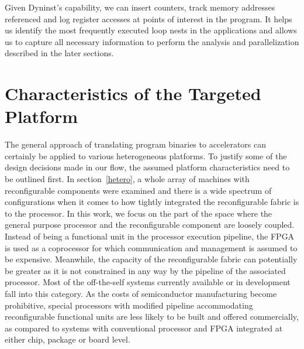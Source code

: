 Given Dyninst's capability, we can insert counters, track memory addresses referenced and log register accesses at points of interest in the program. It helps us
identify the most frequently executed loop nests in the applications and allows us to capture all necessary information to perform the analysis and parallelization described in the later sections. 







\section{Characteristics of the Targeted Platform}
\label{chartarg}
The general approach of translating program binaries to accelerators can certainly be applied to various heterogeneous platforms. To justify some of the design decisions made in our flow, the assumed platform 
characteristics need to be outlined first. 
In section~\ref{hetero}, a whole array of machines with reconfigurable
components were examined and there is a wide spectrum of configurations
when it comes to how tightly integrated the reconfigurable fabric is to
the processor. 
In this work, we focus on the part of the space where the general purpose processor and the reconfigurable component are loosely coupled.
Instead of being a functional unit in the processor
execution pipeline, the FPGA is used as a coprocessor for which
communication and management is assumed to be expensive.
Meanwhile, the capacity of the reconfigurable fabric can potentially be greater as it is not constrained in any way by the pipeline of the associated processor. 
Most of the off-the-self systems currently available or in development~\cite{xeonwithfpga} fall into this category. As the
costs of semiconductor manufacturing become prohibitive, 
special processors with modified pipeline accommodating
reconfigurable functional units are less likely to be built
and offered commercially, as compared to systems with conventional
processor and FPGA integrated at either chip, package or board level.

